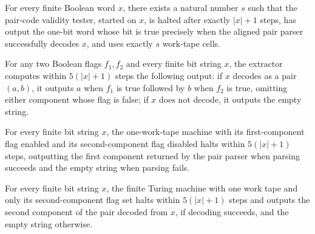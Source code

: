 \begin{theorem}
\label{Turing.FinTM.pairValidTM_computes}
\leanok
{}
For every finite Boolean word $x$, there exists a natural number $s$ such that the
pair-code validity tester, started on $x$, is halted after exactly $|x|+1$ steps, has
output the one-bit word whose bit is true precisely when the aligned pair parser
successfully decodes $x$, and uses exactly $s$ work-tape cells.
\end{theorem}

\begin{theorem}
\label{Turing.FinTM.pairExtractTM_computes}
\leanok
{}
For any two Boolean flags $f_1,f_2$ and every finite bit string $x$, the extractor
computes within $5(|x|+1)$ steps the following output: if $x$ decodes as a pair $(a,b)$,
it outputs $a$ when $f_1$ is true followed by $b$ when $f_2$ is true, omitting either
component whose flag is false; if $x$ does not decode, it outputs the empty string.
\end{theorem}

\begin{theorem}
\label{Turing.FinTM.pairExtractTM_fst}
\leanok
{}
For every finite bit string $x$, the one-work-tape machine with its first-component flag
enabled and its second-component flag disabled halts within $5(|x|+1)$ steps, outputting
the first component returned by the pair parser when parsing succeeds and the empty
string when parsing fails.
\end{theorem}

\begin{theorem}
\label{Turing.FinTM.pairExtractTM_snd}
\leanok
{}
For every finite bit string $x$, the finite Turing machine with one work tape and only
its second-component flag set halts within $5(|x|+1)$ steps and outputs the second
component of the pair decoded from $x$, if decoding succeeds, and the empty string
otherwise.
\end{theorem}

